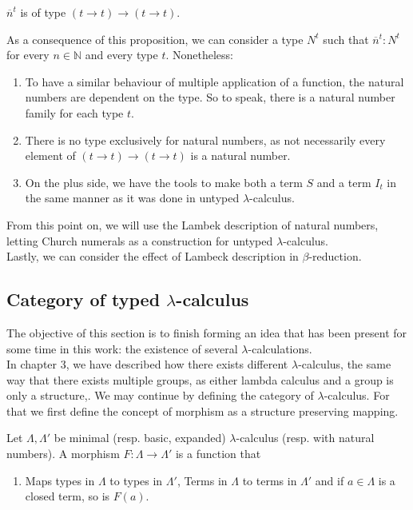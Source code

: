 \begin{definition}
\begin{definition}
\end{definition}

\begin{remark}
  $\overline n^t$ is of type $(t\to t)\to(t\to t)$.
\end{remark}

As a consequence of this proposition, we can consider a type $N^t$ such that $\overline n^t:N^t$ for every $n\in\mathbb{N}$ and every type $t$. Nonetheless:
\begin{enumerate}

\item To have a similar behaviour of multiple application of a function, the natural numbers are dependent on the type. So to speak, there is a natural number family for each type $t$.
\item There is no type exclusively for natural numbers, as not necessarily every element of $(t\to t)\to(t\to t)$ is a natural number.
\item On the plus side, we have the tools to make both a term $S$ and a term $I_t$ in the same manner as it was done in untyped $\lambda$-calculus. \\
\end{enumerate}
From this point on, we will use the Lambek description of natural numbers, letting Church numerals as a construction for untyped $\lambda$-calculus.\\

Lastly, we can consider the effect of Lambeck description in $\beta$-reduction.

\subsection{Category of typed $\lambda$-calculus}

The objective of this section is to finish forming an idea that has been present for some time in this work: the existence of several $\lambda$-calculations. \\

In chapter 3, we have described how there exists different $\lambda$-calculus, the same way that there exists multiple groups, as either lambda calculus and a group is only a structure,. We may continue by defining the category of $\lambda$-calculus. For that we first define the concept of morphism as a structure preserving mapping.



\begin{definition}
  Let $\Lambda, \Lambda '$ be minimal (resp. basic, expanded) $\lambda$-calculus (resp. with natural numbers). A morphism $F: \Lambda \to \Lambda '$ is a function that
  \begin{enumerate}
  \item Maps types in $\Lambda$ to types in $\Lambda '$, Terms in $\Lambda$ to terms in $\Lambda '$ and if $a\in \Lambda$ is a closed term, so is $F(a)$.
  

\end{enumerate}
\end{definition}
\end{definition}
